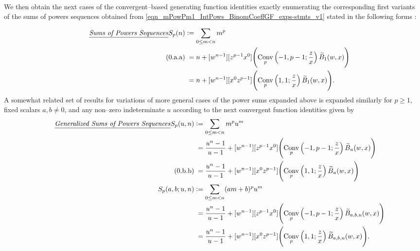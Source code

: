 \documentclass[12pt,reqno]{article}
\renewenvironment{subequations}{%
  \refstepcounter{equation}%
  \edef\theparentequation{\theequation}%
  \setcounter{parentequation}{\value{equation}}%
  \setcounter{equation}{0}%
  \def\theequation{\theparentequation.\alph{equation}}%
  \ignorespaces
}{%
  \setcounter{equation}{\value{parentequation}}%
  \ignorespacesafterend
}
\numberwithin{sfootnote}{section}
\numberwithin{equation}{section}
\newcommand{\tagonce}[0]{
     \addtocounter{equation}{1}
     \tag{\theequation}
}
\newcommand{\tagtext}[1]{\tag*{\underline{\textit{#1}}}}
\theoremstyle{DefaultTheoremStyle}
\theoremstyle{definition}
\newcommand{\defequals}{\ensuremath{\vcentcolon=}}
\newcommand{\StartGroupingSubEquations}{\begin{subequations}}
\newcommand{\EndGroupingSubEquations}{\end{subequations}}
\newcommand{\ConvGF}[4]{\ensuremath{\Conv_{#1}\left(#2, #3; #4\right)}}
\DeclareMathOperator{\Conv}{Conv}
\begin{document}
We then obtain the next cases of the 
convergent--based generating function identities exactly 
enumerating the corresponding first variants of the 
sums of powers sequences obtained from 
\eqref{eqn_mPowPm1_IntPows_BinomCoeffGF_exps-stmts_v1} 
stated in the following forms \citep[\S 6.5, \S 7.6]{GKP}: 
\StartGroupingSubEquations 
\label{eqn_defs_and_ConvFnExps_of_the_GenSUmsOfPowersSeqs} 
\begin{align*} 
\tagtext{Sums of Powers Sequences} 
S_p(n) & \defequals 
     \sum_{0 \leq m < n} m^{p} \\ 
\tagonce\label{eqn_Spn_Conv_and_BNumGF_ident_ex-stmt_v1} 
     & \phantom{:} = 
     n + 
     [w^{n-1}] [z^{p-1} x^0] \Biggl( 
     \ConvGF{p}{-1}{p-1}{\frac{z}{x}} \widetilde{B}_1(w, x) 
     \Biggr) \\ 
     & \phantom{:} = 
     n + 
     [w^{n-1}] [x^0 z^{p-1}] \Biggl( 
     \ConvGF{p}{1}{1}{\frac{z}{x}} \widetilde{B}_1(w, x) 
     \Biggr). 
\end{align*} 
A somewhat related set of results for 
variations of more general cases of the 
power sums expanded above is expanded similarly 
for $p \geq 1$, fixed scalars $a,b \neq 0$, and 
any non--zero indeterminate $u$ according to the 
next convergent function identities given by 
\begin{align*} 
\tagtext{Generalized Sums of Powers Sequences} 
S_{p}(u, n) & \defequals 
     \sum_{0 \leq m < n} m^{p} u^{m} \\ 
     & \phantom{:} = 
     \frac{u^{n} - 1}{u-1} + 
     [w^{n-1}] [z^{p-1} x^{0}] \Biggl( 
     \ConvGF{p}{-1}{p-1}{\frac{z}{x}} 
     \widetilde{B}_u(w, x)
     \Biggr) \\ 
\tagonce\label{eqn_Spn_Conv_and_BNumGF_ident_ex-stmt_v2} 
     & \phantom{:} = 
     \frac{u^{n} - 1}{u-1} + 
     [w^{n-1}] [x^0 z^{p-1}] \Biggl( 
     \ConvGF{p}{1}{1}{\frac{z}{x}} 
     \widetilde{B}_u(w, x)
     \Biggr) \\ 
S_{p}(a, b; u, n) & \defequals 
     \sum_{0 \leq m < n} (am+b)^{p} u^{m} \\ 
     & \phantom{:} = 
     \frac{u^{n} - 1}{u-1} + 
     [w^{n-1}] [z^{p-1} x^{0}] \Biggl( 
     \ConvGF{p}{-1}{p-1}{\frac{z}{x}} 
     \widetilde{B}_{a,b,u}(w, x)
     \Biggr) \\ 
     & \phantom{:} = 
     \frac{u^{n} - 1}{u-1} + 
     [w^{n-1}] [x^0 z^{p-1}] \Biggl( 
     \ConvGF{p}{1}{1}{\frac{z}{x}} 
     \widetilde{B}_{a,b,u}(w, x)
     \Biggr). 
\end{align*} 
\EndGroupingSubEquations 
\end{document}
